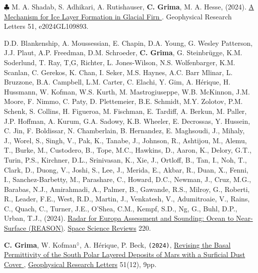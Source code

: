 \begin{etaremune}
\item
  $\clubsuit$ M. A. Shadab, S. Adhikari, A. Rutishauser, \textbf{C. Grima}, M. A. Hesse, (2024). \href{https://doi.org/10.1029/2024GL109893}{A Mechanism for Ice Layer Formation in Glacial Firn \aiOpenAccessSquare}. Geophysical Research Letters 51, e2024GL109893.

\item
  D.D. Blankenship, A. Moussessian, E. Chapin, D.A. Young, G. Wesley Patterson, J.J. Plaut, A.P. Freedman, D.M. Schroeder, \textbf{C. Grima}, G. Steinbrügge, K.M. Soderlund, T. Ray, T,G, Richter, L. Jones-Wilson, N.S. Wolfenbarger, K.M. Scanlan, C. Gerekos, K. Chan, I. Seker, M.S. Haynes, A.C. Barr Mlinar, L. Bruzzone, B.A. Campbell, L.M. Carter, C. Elachi, Y. Gim, A. Hérique, H. Hussmann, W. Kofman, W.S. Kurth, M. Mastrogiuseppe, W.B. McKinnon, J.M. Moore, F. Nimmo, C. Paty, D. Plettemeier, B.E. Schmidt, M.Y. Zolotov, P.M. Schenk, S. Collins, H. Figueroa, M. Fischman, E. Tardiff, A. Berkun, M. Paller, J.P. Hoffman, A. Kurum, G.A. Sadowy, K.B. Wheeler, E. Decrossas, Y. Hussein, C. Jin, F. Boldissar, N. Chamberlain, B. Hernandez, E. Maghsoudi, J., Mihaly, J., Worel, S., Singh, V., Pak, K., Tanabe, J., Johnson, R., Ashtijou, M., Alemu, T., Burke, M., Custodero, B., Tope, M.C., Hawkins, D., Aaron, K., Delory, G.T., Turin, P.S., Kirchner, D.L., Srinivasan, K., Xie, J., Ortloff, B., Tan, I., Noh, T., Clark, D., Duong, V., Joshi, S., Lee, J., Merida, E., Akbar, R., Duan, X., Fenni, I., Sanchez-Barbetty, M., Parashare, C., Howard, D.C., Newman, J., Cruz, M.G., Barabas, N.J., Amirahmadi, A., Palmer, B., Gawande, R.S., Milroy, G., Roberti, R., Leader, F.E., West, R.D., Martin, J., Venkatesh, V., Adumitroaie, V., Rains, C., Quach, C., Turner, J.E., O’Shea, C.M., Kempf, S.D., Ng, G., Buhl, D.P., Urban, T.J., (2024). \href{https://doi.org/10.1007/s11214-024-01072-3}{Radar for Europa Assessment and Sounding: Ocean to Near-Surface (REASON)}. \ul{Space Science Reviews} 220. 


\item
  \textbf{C. Grima}, W. Kofman$^\lozenge$, A. Hérique, P. Beck, \texttt{(2024)}, \href{https://agupubs.onlinelibrary.wiley.com/doi/10.1029/2024GL109085}{Revising the Basal Permittivity of the South Polar Layered Deposits of Mars with a Surficial Dust Cover \aiOpenAccessSquare}, \ul{Geophysical Research Letters} 51(12), 9pp.
  

\end{etaremune}
